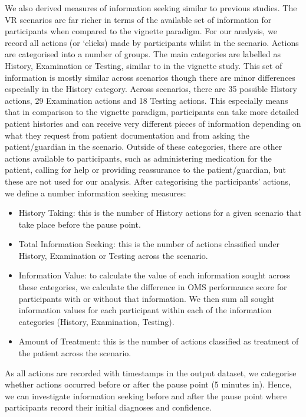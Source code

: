 \documentclass[a4paper, nobind]{templates/ociamthesis}
\providecommand{\tightlist}{%
  \setlength{\itemsep}{0pt}\setlength{\parskip}{0pt}}
\begin{document}
We also derived measures of information seeking similar to previous studies. The VR scenarios are far richer in terms of the available set of information for participants when compared to the vignette paradigm. For our analysis, we record all actions (or `clicks) made by participants whilst in the scenario. Actions are categorised into a number of groups. The main categories are labelled as History, Examination or Testing, similar to in the vignette study. This set of information is mostly similar across scenarios though there are minor differences especially in the History category. Across scenarios, there are 35 possible History actions, 29 Examination actions and 18 Testing actions. This especially means that in comparison to the vignette paradigm, participants can take more detailed patient histories and can receive very different pieces of information depending on what they request from patient documentation and from asking the patient/guardian in the scenario. Outside of these categories, there are other actions available to participants, such as administering medication for the patient, calling for help or providing reassurance to the patient/guardian, but these are not used for our analysis. After categorising the participants' actions, we define a number information seeking measures:

\begin{itemize}
\tightlist
\item
  History Taking: this is the number of History actions for a given scenario that take place before the pause point.
\item
  Total Information Seeking: this is the number of actions classified under History, Examination or Testing across the scenario.
\item
  Information Value: to calculate the value of each information sought across these categories, we calculate the difference in OMS performance score for participants with or without that information. We then sum all sought information values for each participant within each of the information categories (History, Examination, Testing).
\item
  Amount of Treatment: this is the number of actions classified as treatment of the patient across the scenario.
\end{itemize}

As all actions are recorded with timestamps in the output dataset, we categorise whether actions occurred before or after the pause point (5 minutes in). Hence, we can investigate information seeking before and after the pause point where participants record their initial diagnoses and confidence.
\end{document}
